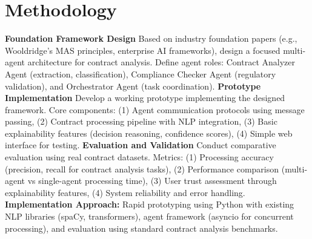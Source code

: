
\section{Methodology}\label{section:methodology}

\textbf{Foundation Framework Design}
Based on industry foundation papers (e.g., Wooldridge's MAS principles, enterprise AI frameworks), design a focused multi-agent architecture for contract analysis. Define agent roles: Contract Analyzer Agent (extraction, classification), Compliance Checker Agent (regulatory validation), and Orchestrator Agent (task coordination).
\newline
\break
\textbf{Prototype Implementation}
Develop a working prototype implementing the designed framework. Core components: (1) Agent communication protocols using message passing, (2) Contract processing pipeline with NLP integration, (3) Basic explainability features (decision reasoning, confidence scores), (4) Simple web interface for testing.
\newline
\break
\textbf{Evaluation and Validation}
Conduct comparative evaluation using real contract datasets. Metrics: (1) Processing accuracy (precision, recall for contract analysis tasks), (2) Performance comparison (multi-agent vs single-agent processing time), (3) User trust assessment through explainability features, (4) System reliability and error handling.
\newline
\break
\textbf{Implementation Approach:} Rapid prototyping using Python with existing NLP libraries (spaCy, transformers), agent framework (asyncio for concurrent processing), and evaluation using standard contract analysis benchmarks.
